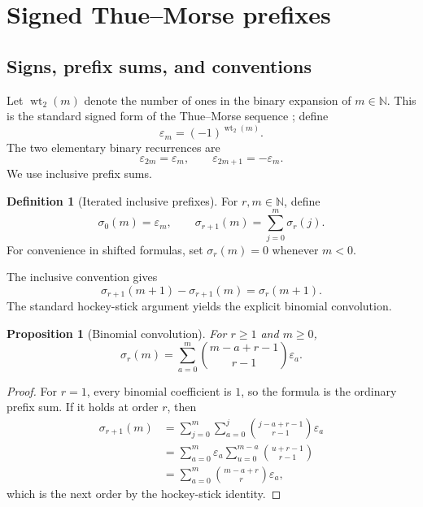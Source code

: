\documentclass[11pt]{article}
\newtheorem{proposition}[theorem]{Proposition}
\theoremstyle{definition}
\newtheorem{definition}[theorem]{Definition}
\theoremstyle{remark}
\newcommand{\N}{\mathbb N}
\newcommand{\eps}{\varepsilon}
\newcommand{\wt}{\operatorname{wt}_2}
\begin{document}
\section{Signed Thue--Morse prefixes}

\subsection{Signs, prefix sums, and conventions}

Let \(\wt(m)\) denote the number of ones in the binary expansion of
\(m\in\N\).  This is the standard signed form of the Thue--Morse
sequence \cite{AlloucheShallit}; define
\begin{equation}
 \eps_m=(-1)^{\wt(m)}.                                      \label{eq:eps-def}
\end{equation}
The two elementary binary recurrences are
\begin{equation}
 \eps_{2m}=\eps_m,
 \qquad
 \eps_{2m+1}=-\eps_m.                                      \label{eq:eps-binary}
\end{equation}
We use inclusive prefix sums.

\begin{definition}[Iterated inclusive prefixes]
For \(r,m\in\N\), define
\begin{equation}
 \sigma_0(m)=\eps_m,
 \qquad
 \sigma_{r+1}(m)=\sum_{j=0}^{m}\sigma_r(j).                \label{eq:sigma-def}
\end{equation}
For convenience in shifted formulas, set \(\sigma_r(m)=0\) whenever
\(m<0\).
\end{definition}

The inclusive convention gives
\begin{equation}
 \sigma_{r+1}(m+1)-\sigma_{r+1}(m)=\sigma_r(m+1).           \label{eq:sigma-diff}
\end{equation}
The standard hockey-stick argument yields the explicit binomial convolution.

\begin{proposition}[Binomial convolution]
For \(r\geq1\) and \(m\geq0\),
\begin{equation}
 \sigma_r(m)=\sum_{a=0}^{m}
   \binom{m-a+r-1}{r-1}\eps_a.                             \label{eq:sigma-conv}
\end{equation}
\end{proposition}

\begin{proof}
For \(r=1\), every binomial coefficient is \(1\), so the formula is the
ordinary prefix sum.  If it holds at order \(r\), then
\begin{align*}
 \sigma_{r+1}(m)
 &=\sum_{j=0}^{m}\sum_{a=0}^{j}
      \binom{j-a+r-1}{r-1}\eps_a \\
 &=\sum_{a=0}^{m}\eps_a
      \sum_{u=0}^{m-a}\binom{u+r-1}{r-1} \\
 &=\sum_{a=0}^{m}\binom{m-a+r}{r}\eps_a,
\end{align*}
which is the next order by the hockey-stick identity.
\end{proof}
\end{document}
